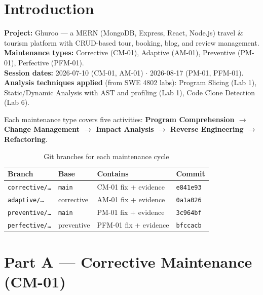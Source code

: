 \documentclass[11pt,a4paper]{article}
\begin{document}
\newpage
\tableofcontents
\newpage

\section*{Introduction}

\noindent\textbf{Project:} Ghuroo --- a MERN (MongoDB, Express, React, Node.js) travel \&
tourism platform with CRUD-based tour, booking, blog, and review management.\\[3pt]
\textbf{Maintenance types:} Corrective (CM-01), Adaptive (AM-01), Preventive (PM-01),
Perfective (PFM-01).\\[3pt]
\textbf{Session dates:} 2026-07-10 (CM-01, AM-01) $\cdot$ 2026-08-17 (PM-01, PFM-01).\\[3pt]
\textbf{Analysis techniques applied} (from SWE 4802 labs):
Program Slicing (Lab 1), Static/Dynamic Analysis with AST and profiling (Lab 1),
Code Clone Detection (Lab 6).

Each maintenance type covers five activities:
\textbf{Program Comprehension $\to$ Change Management $\to$ Impact Analysis
$\to$ Reverse Engineering $\to$ Refactoring}.

\begin{table}[H]
\centering\small
\begin{tabularx}{\textwidth}{@{}llXl@{}}
\toprule
\textbf{Branch} & \textbf{Base} & \textbf{Contains} & \textbf{Commit} \\
\midrule
\texttt{corrective/\ldots} & \texttt{main} & CM-01 fix + evidence & \texttt{e841e93} \\
\texttt{adaptive/\ldots}   & corrective    & AM-01 fix + evidence & \texttt{0a1a026} \\
\texttt{preventive/\ldots} & \texttt{main} & PM-01 fix + evidence & \texttt{3c964bf} \\
\texttt{perfective/\ldots} & preventive    & PFM-01 fix + evidence & \texttt{bfccacb} \\
\bottomrule
\end{tabularx}
\caption{Git branches for each maintenance cycle}
\end{table}

\newpage
\section{Part A --- Corrective Maintenance (CM-01)}
\end{document}
